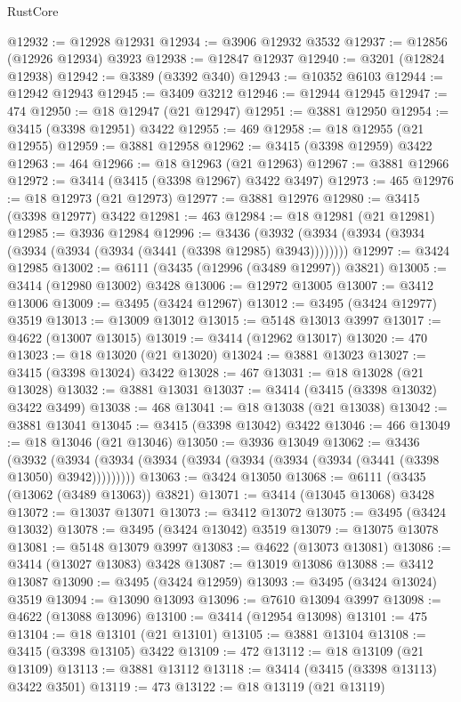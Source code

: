\begin{lexlean}{RustCore}
\begin{coremodule}
@12932 := @12928 @12931
@12934 := @3906 @12932 @3532
@12937 := @12856 (@12926 @12934) @3923
@12938 := @12847 @12937
@12940 := @3201 (@12824 @12938)
@12942 := @3389 (@3392 @340)
@12943 := @10352 @6103
@12944 := @12942 @12943
@12945 := @3409 @3212
@12946 := @12944 @12945
@12947 := 474
@12950 := @18 @12947 (@21 @12947)
@12951 := @3881 @12950
@12954 := @3415 (@3398 @12951) @3422
@12955 := 469
@12958 := @18 @12955 (@21 @12955)
@12959 := @3881 @12958
@12962 := @3415 (@3398 @12959) @3422
@12963 := 464
@12966 := @18 @12963 (@21 @12963)
@12967 := @3881 @12966
@12972 := @3414 (@3415 (@3398 @12967) @3422 @3497)
@12973 := 465
@12976 := @18 @12973 (@21 @12973)
@12977 := @3881 @12976
@12980 := @3415 (@3398 @12977) @3422
@12981 := 463
@12984 := @18 @12981 (@21 @12981)
@12985 := @3936 @12984
@12996 := @3436 (@3932 (@3934 (@3934 (@3934 (@3934 (@3934 (@3934 (@3441 (@3398 @12985) @3943))))))))
@12997 := @3424 @12985
@13002 := @6111 (@3435 (@12996 (@3489 @12997)) @3821)
@13005 := @3414 (@12980 @13002) @3428
@13006 := @12972 @13005
@13007 := @3412 @13006
@13009 := @3495 (@3424 @12967)
@13012 := @3495 (@3424 @12977) @3519
@13013 := @13009 @13012
@13015 := @5148 @13013 @3997
@13017 := @4622 (@13007 @13015)
@13019 := @3414 (@12962 @13017)
@13020 := 470
@13023 := @18 @13020 (@21 @13020)
@13024 := @3881 @13023
@13027 := @3415 (@3398 @13024) @3422
@13028 := 467
@13031 := @18 @13028 (@21 @13028)
@13032 := @3881 @13031
@13037 := @3414 (@3415 (@3398 @13032) @3422 @3499)
@13038 := 468
@13041 := @18 @13038 (@21 @13038)
@13042 := @3881 @13041
@13045 := @3415 (@3398 @13042) @3422
@13046 := 466
@13049 := @18 @13046 (@21 @13046)
@13050 := @3936 @13049
@13062 := @3436
    (@3932 (@3934 (@3934 (@3934 (@3934 (@3934 (@3934 (@3934 (@3441 (@3398 @13050) @3942)))))))))
@13063 := @3424 @13050
@13068 := @6111 (@3435 (@13062 (@3489 @13063)) @3821)
@13071 := @3414 (@13045 @13068) @3428
@13072 := @13037 @13071
@13073 := @3412 @13072
@13075 := @3495 (@3424 @13032)
@13078 := @3495 (@3424 @13042) @3519
@13079 := @13075 @13078
@13081 := @5148 @13079 @3997
@13083 := @4622 (@13073 @13081)
@13086 := @3414 (@13027 @13083) @3428
@13087 := @13019 @13086
@13088 := @3412 @13087
@13090 := @3495 (@3424 @12959)
@13093 := @3495 (@3424 @13024) @3519
@13094 := @13090 @13093
@13096 := @7610 @13094 @3997
@13098 := @4622 (@13088 @13096)
@13100 := @3414 (@12954 @13098)
@13101 := 475
@13104 := @18 @13101 (@21 @13101)
@13105 := @3881 @13104
@13108 := @3415 (@3398 @13105) @3422
@13109 := 472
@13112 := @18 @13109 (@21 @13109)
@13113 := @3881 @13112
@13118 := @3414 (@3415 (@3398 @13113) @3422 @3501)
@13119 := 473
@13122 := @18 @13119 (@21 @13119)

\end{coremodule}
\end{lexlean}
